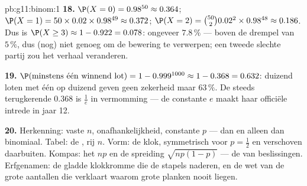 \begin{solution}{pb:g11:binom:1}
\textbf{18.} $\P(X = 0) = 0.98^{50} \approx 0.364$;
$\P(X = 1) = 50 \times 0.02 \times 0.98^{49} \approx 0.372$;
$\P(X = 2) = \binom{50}{2} 0.02^2 \times 0.98^{48} \approx 0.186$. Dus is
$\P(X \geq 3) \approx 1 - 0.922 = 0.078$: ongeveer $7.8\,\%$ --- boven de
drempel van $5\,\%$, dus (nog) niet genoeg om de bewering te verwerpen; een
tweede slechte partij zou het verhaal veranderen.

\textbf{19.} $\P(\text{minstens één winnend lot}) = 1 - 0.999^{1000}
\approx 1 - 0.368 = 0.632$: duizend loten met  één op duizend geven geen
zekerheid maar $63\,\%$. De steeds terugkerende $0.368$ is $\frac1e$ in
vermomming --- de constante $e$ maakt haar officiële intrede in jaar 12.

\textbf{20.} Herkenning: vaste $n$, onafhankelijkheid, constante $p$ --- dan
en alleen dan binomiaal. Tabel: de , rij $n$. Vorm: de
klok, symmetrisch voor $p = \frac12$ en verschoven daarbuiten. Kompas: het
 $np$ en de spreiding $\sqrt{np(1-p)}$ --- de  van
beslissingen. Erfgenamen: de gladde klokkromme die de stapels naderen, en de
wet van de grote aantallen die verklaart waarom grote planken nooit liegen.
\end{solution}
